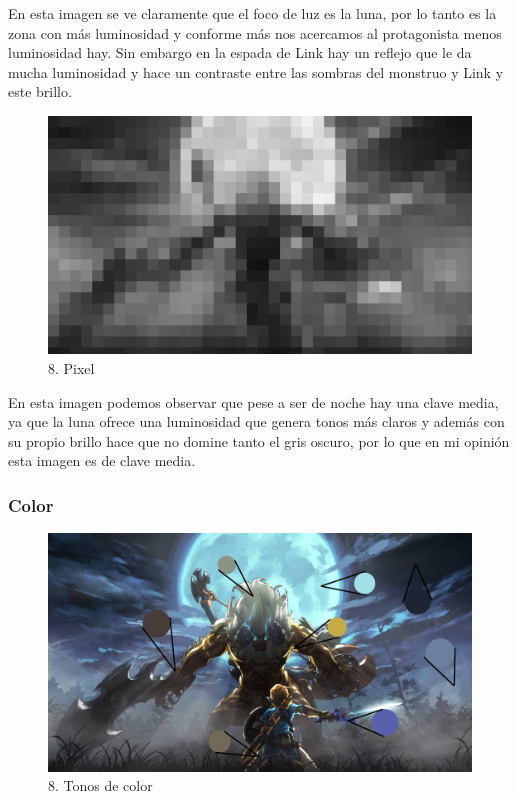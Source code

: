 \documentclass[12pt]{article}
\begin{document}
 En esta imagen se ve claramente que el foco de luz es la luna, por lo tanto es la zona con más luminosidad y conforme más nos acercamos al protagonista menos luminosidad hay. Sin embargo en la espada de Link hay un reflejo que le da mucha luminosidad y hace un contraste entre las sombras del monstruo y Link y este brillo.

\begin{figure}[H]
      \centering
      \includegraphics[scale=0.25]{images/Raúl/Sección 8/Imagen 8 gris pixel.jpg}
      \caption{\small 8. Pixel}
    \end{figure}

 En esta imagen podemos observar que pese a ser de noche hay una clave media, ya que la luna ofrece una luminosidad que genera tonos más claros y además con su propio brillo hace que no domine tanto el gris oscuro, por lo que en mi opinión esta imagen es de clave media.

        \subsubsection{Color}

\begin{figure}[H]
      \centering
      \includegraphics[scale=0.25]{images/Raúl/Sección 8/Imagen 8 tonos.jpg}
      \caption{\small 8. Tonos de color}
    \end{figure}
\end{document}
